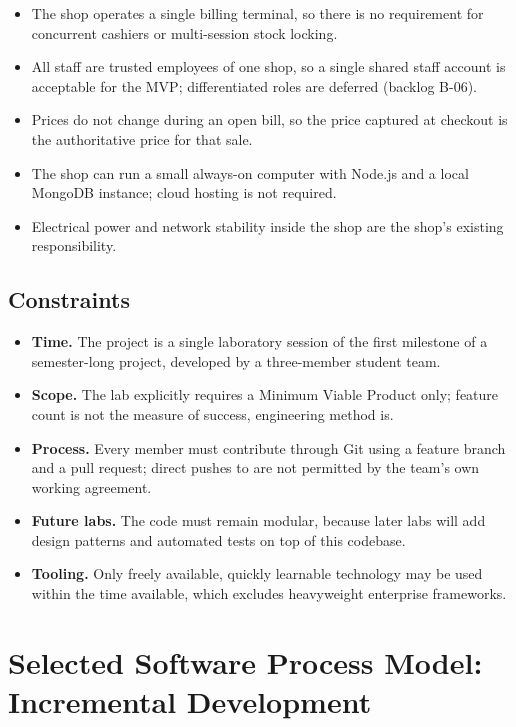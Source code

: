 \documentclass[11pt,a4paper]{article}
\newcommand{\filep}[1]{\texttt{\small\color{navy}\detokenize{#1}}}
\begin{document}
\begin{itemize}
  \item The shop operates a single billing terminal, so there is no requirement for
        concurrent cashiers or multi-session stock locking.
  \item All staff are trusted employees of one shop, so a single shared staff account is
        acceptable for the MVP; differentiated roles are deferred (backlog B-06).
  \item Prices do not change during an open bill, so the price captured at checkout is the
        authoritative price for that sale.
  \item The shop can run a small always-on computer with Node.js and a local MongoDB
        instance; cloud hosting is not required.
  \item Electrical power and network stability inside the shop are the shop's existing
        responsibility.
\end{itemize}

\subsection{Constraints}

\begin{itemize}
  \item \textbf{Time.} The project is a single laboratory session of the first milestone of
        a semester-long project, developed by a three-member student team.
  \item \textbf{Scope.} The lab explicitly requires a Minimum Viable Product only; feature
        count is not the measure of success, engineering method is.
  \item \textbf{Process.} Every member must contribute through Git using a feature branch and
        a pull request; direct pushes to \filep{main} are not permitted by the team's own
        working agreement.
  \item \textbf{Future labs.} The code must remain modular, because later labs will add
        design patterns and automated tests on top of this codebase.
  \item \textbf{Tooling.} Only freely available, quickly learnable technology may be used
        within the time available, which excludes heavyweight enterprise frameworks.
\end{itemize}

\section{Selected Software Process Model: Incremental Development}
\label{sec:model}
\end{document}
